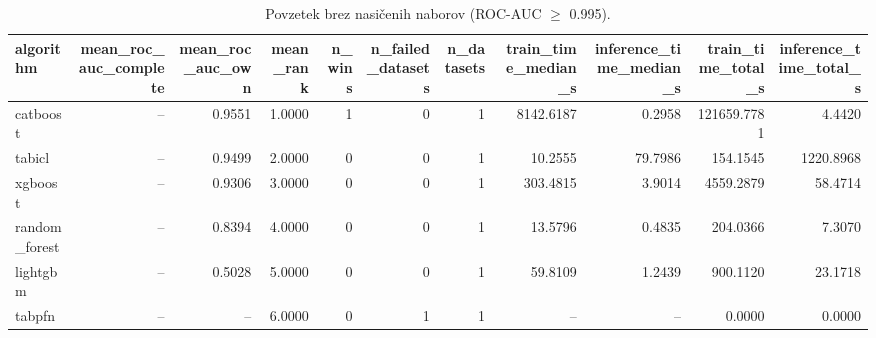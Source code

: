 \begin{table}[htbp]
\centering
\caption{Povzetek brez nasičenih naborov (ROC-AUC $\geq$ 0.995).}
\label{tab:overall-nonsat}
\begin{tabular}{lrrrrrrrrrr}
\hline
algorithm & mean\_roc\_auc\_complete & mean\_roc\_auc\_own & mean\_rank & n\_wins & n\_failed\_datasets & n\_datasets & train\_time\_median\_s & inference\_time\_median\_s & train\_time\_total\_s & inference\_time\_total\_s \\
\hline
catboost & -- & 0.9551 & 1.0000 & 1 & 0 & 1 & 8142.6187 & 0.2958 & 121659.7781 & 4.4420 \\
tabicl & -- & 0.9499 & 2.0000 & 0 & 0 & 1 & 10.2555 & 79.7986 & 154.1545 & 1220.8968 \\
xgboost & -- & 0.9306 & 3.0000 & 0 & 0 & 1 & 303.4815 & 3.9014 & 4559.2879 & 58.4714 \\
random\_forest & -- & 0.8394 & 4.0000 & 0 & 0 & 1 & 13.5796 & 0.4835 & 204.0366 & 7.3070 \\
lightgbm & -- & 0.5028 & 5.0000 & 0 & 0 & 1 & 59.8109 & 1.2439 & 900.1120 & 23.1718 \\
tabpfn & -- & -- & 6.0000 & 0 & 1 & 1 & -- & -- & 0.0000 & 0.0000 \\
\hline
\end{tabular}
\end{table}
